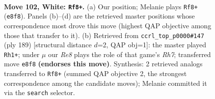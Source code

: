 \documentclass[11pt]{article}
\begin{document}
\begin{figure}[p]\centering
\begin{subfigure}{0.46\textwidth}\centering
\resizebox{\linewidth}{!}{%
\newchessgame
\chessboard[
  setfen={4R3/8/5k2/8/7r/r7/5K2/8 w - - 14 102},
  showmover=false,
  pgfstyle=straightmove, color=movearrow, markmove={e8-f8}
]}
\caption{}
\end{subfigure}\hfill
\begin{subfigure}{0.46\textwidth}\centering
\resizebox{\linewidth}{!}{%
\newchessgame
\chessboard[
  setfen={1k6/8/8/8/8/2R5/7r/1K6 b - - 21 95},
  showmover=false,
  pgfstyle=straightmove, color=movearrow, markmove={h2-h1}
]}
\caption{}
\end{subfigure}
\\[4pt]

\caption{\textbf{Move 102, White: \texttt{Rf8+}.} (a) Our position; Melanie plays \texttt{Rf8+} (\texttt{e8f8}). Panels (b)--(d) are the retrieved master positions whose correspondence most drove this move (highest QAP objective among those that transfer to it). (b) Retrieved from \texttt{ccrl\_top\_p0000\#147} (ply 189) [structural distance $d$=2, QAP obj=1]: the master played \texttt{Rh1+}; under $\mu$ our \emph{Re8} plays the role of that game's \emph{Rh7}; transferred move \texttt{e8f8} \textbf{(endorses this move)}. Synthesis: 2 retrieved analogs transferred to \texttt{Rf8+} (summed QAP objective 2, the strongest correspondence among the candidate moves); Melanie committed it via the \texttt{search} selector.}
\label{fig:thought-m202}
\end{figure}

\clearpage
\end{document}
